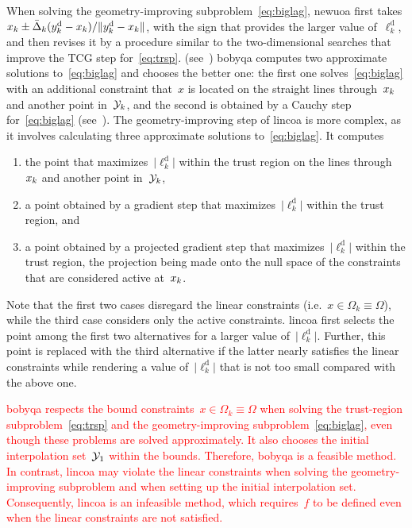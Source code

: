 \documentclass[
    smallextended,  %
    final,          %
]{svjour3}
\newcommand{\abs}[2][]{#1\lvert#2#1\rvert}
\newcommand{\drop}{{\text{d}}}
\newcommand{\fsetm}[1][k]{\Omega_{#1}}
\newcommand{\fset}{\Omega}
\newcommand{\iter}[1][k]{x\ifthenelse{\equal{#1}{}}{}{_{#1}}}
\newcommand{\obj}{f}
\newcommand{\radalt}[1][k]{\bar{\Delta}\ifthenelse{\equal{#1}{}}{}{_{#1}}}
\newcommand{\xpt}[1][k]{\mathcal{Y}\ifthenelse{\equal{#1}{}}{}{_{#1}}}
\newcommand{\red}{\textcolor{red}}
\begin{document}
When solving the geometry-improving subproblem~\eqref{eq:biglag},
\gls{newuoa} first takes $\iter \pm \radalt (y_k^\drop - \iter)/\|y_k^\drop -\iter\|$,
with the sign that provides the larger value of~$\ell_k^\drop$, and then revises it by
a procedure similar to the two-dimensional searches that improve the TCG step for~\eqref{eq:trsp}.
(see~\cite[\S~6]{Powell_2006})
\gls{bobyqa} computes two approximate solutions to~\eqref{eq:biglag} and chooses the better one:
the first one solves~\eqref{eq:biglag} with an additional constraint that~$x$ is located on the
straight lines through~$\iter$ and another point in~$\xpt$, and the second is obtained by a Cauchy
step for~\eqref{eq:biglag} (see~\cite[\S~3]{Powell_2009}).
The geometry-improving step of \gls{lincoa} is more complex, as it involves calculating three
approximate solutions to~\eqref{eq:biglag}.
It computes
\begin{enumerate}
    \item the point that maximizes~$\abs{\ell_k^{\drop}}$ within the trust region on the lines
        through~$\iter$ and another point in~$\xpt$,
    \item a point obtained by a gradient step that maximizes~$\abs{\ell_k^{\drop}}$ within the trust region, and
    \item a point obtained by a projected gradient step that maximizes~$\abs{\ell_k^{\drop}}$ within the trust region, the projection being made onto the null space of the constraints that are considered active at~$\iter$.
\end{enumerate}
Note that the first two cases disregard the linear constraints (i.e.~$x\in\fsetm \equiv
\fset$), while the third case
considers only the active constraints.
\gls{lincoa} first selects the point among the first two alternatives for a larger value of~$\abs{\ell_k^{\drop}}$.
Further, this point is replaced with the third alternative if the latter nearly satisfies the linear
constraints while rendering a value of~$\abs{\ell_k^{\drop}}$ that is not too small compared with the above one.

\red{
\gls{bobyqa} respects the bound constraints~$x\in\fsetm \equiv \fset$ when
solving the trust-region subproblem~\eqref{eq:trsp} and the geometry-improving subproblem~\eqref{eq:biglag},
even though these problems are solved approximately. It also chooses the initial interpolation
set~$\xpt[1]$ within the bounds. Therefore, \gls{bobyqa} is a feasible method.
In contrast, \gls{lincoa} may violate the linear constraints when solving the geometry-improving
subproblem and when setting up the initial interpolation set. Consequently, \gls{lincoa} is
an infeasible method, which requires~$\obj$ to be defined even when the linear constraints are not satisfied.
}
\end{document}
